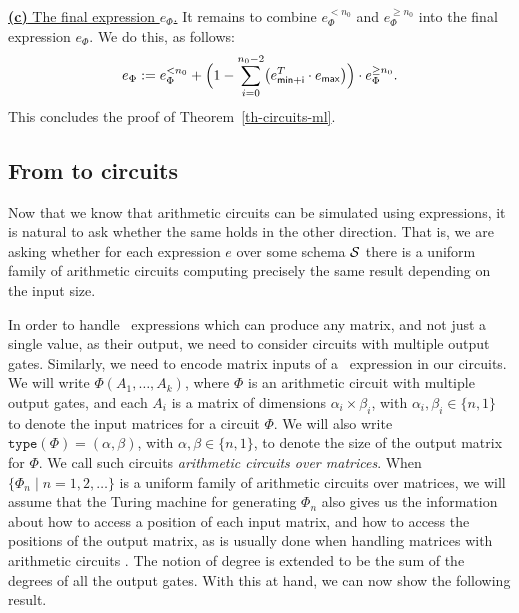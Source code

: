 \medskip
\noindent
\underline{\textbf{(c)} The final expression $e_\Phi$.}
It remains to combine $e_\Phi^{< n_0}$ and $e_{\Phi}^{\geq n_0}$ into the final expression
$e_\Phi$. We do this, as follows:
$$
e_\Phi:=e_\Phi^{< n_0} + \Bigl(1 - \sum_{i=0}^{n_0-2} \bigl(e_{\mathsf{min}+\mathsf{i}}^T\cdot e_{\mathsf{max}}\bigr)\Bigr)\cdot e_{\Phi}^{\geq n_0}.
$$
This concludes the proof of Theorem~\ref{th-circuits-ml}.



\subsection{From \langfor to circuits}\label{subsec:formatlangtoac}

Now that we know that arithmetic circuits can be simulated using \langfor expressions, it is natural to ask whether the same holds in the other direction. That is, we are asking whether for each \langfor expression $e$ over some schema $\mathcal{S}$ there is a uniform family of arithmetic circuits computing precisely the same result depending on the input size. 

In order to handle  \langfor\ expressions which can produce any matrix, and not just a single value, as their output, we need to consider circuits with multiple output gates. Similarly, we need to encode matrix inputs of a \langfor\ expression in our circuits. We will write $\Phi(A_1,\ldots ,A_k)$, where $\Phi$ is an arithmetic circuit with multiple output gates, and each $A_i$ is a matrix of dimensions $\alpha_i\times \beta_i$, with $\alpha_i,\beta_i \in \{n,1\}$ to denote the input matrices for a circuit $\Phi$. We will also write $\texttt{type}(\Phi)=(\alpha,\beta)$, with $\alpha,\beta\in \{n,1\}$, to denote the size of the output matrix for $\Phi$. We call such circuits \textit{arithmetic circuits over matrices}. When $\{\Phi_n\mid n=1,2,\ldots\}$ is a uniform family of arithmetic circuits over matrices, we will assume that the Turing machine for generating $\Phi_n$ also gives us the information about how to access a position of each input matrix, and how to access the positions of the output matrix, as is usually done when handling matrices with arithmetic circuits \cite{Raz02}. The notion of degree is extended to be the sum of the degrees of all the output gates. With this  at hand, we can now show the following result.

